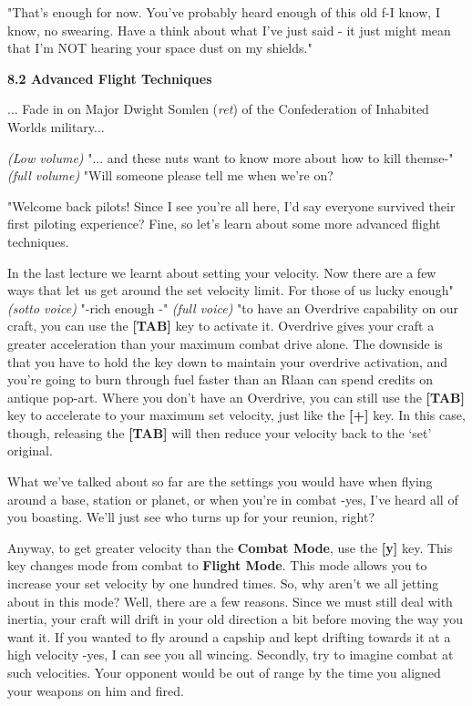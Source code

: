 \documentclass{article}
\begin{document}
"That's enough for now. You've probably heard enough of this old f-I know, I know, no swearing. Have a think about what I've just said - it just might mean that I'm NOT hearing your space dust on my shields." 



\textbf{8.2 Advanced Flight Techniques }

... Fade in on Major Dwight Somlen (\textit{ret}) of the Confederation of Inhabited Worlds military... 

\textit{(Low volume) }"... and these nuts want to know more about how to kill themse-" \textit{(full volume) }"Will someone please tell me when we're on? 

"Welcome back pilots! Since I see you're all here, I'd say everyone survived their first piloting experience? Fine, so let's learn about some more advanced flight techniques. 

In the last lecture we learnt about setting your velocity. Now there are a few ways that let us get around the set velocity limit. For those of us lucky enough" \textit{(sotto voice) }"-rich enough -" \textit{(full voice) }"to have an Overdrive capability on our craft, you can use the \textbf{[TAB] }key to activate it. Overdrive gives your craft a greater acceleration than your maximum combat drive alone. The downside is that you have to hold the key down to maintain your overdrive activation, and you're going to burn through fuel faster than an Rlaan can spend credits on antique pop-art. Where you don't have an Overdrive, you can still use the \textbf{[TAB] }key to accelerate to your maximum set velocity, just like the \textbf{[+] }key. In this case, though, releasing the \textbf{[TAB] }will then reduce your velocity back to the `set' original. 

What we've talked about so far are the settings you would have when flying around a base, station or planet, or when you're in combat -yes, I've heard all of you boasting. We'll just see who turns up for your reunion, right? 

Anyway, to get greater velocity than the \textbf{Combat Mode}, use the \textbf{[y] }key. This key changes mode from combat to \textbf{Flight Mode}. This mode allows you to increase your set velocity by one hundred times. So, why aren't we all jetting about in this mode? Well, there are a few reasons. Since we must still deal with inertia, your craft will drift in your old direction a bit before moving the way you want it. If you wanted to fly around a capship and kept drifting towards it at a high velocity -yes, I can see you all wincing. Secondly, try to imagine combat at such velocities. Your opponent would be out of range by the time you aligned your weapons on him and fired. 
\end{document}
